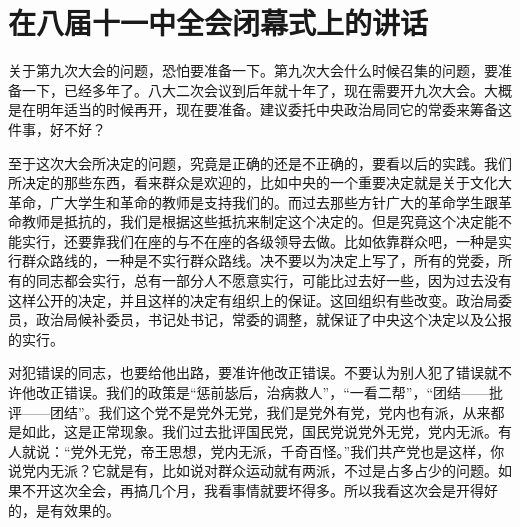 \section[在八届十一中全会闭幕式上的讲话（一九六六年八月十二日）]{在八届十一中全会闭幕式上的讲话}


关于第九次大会的问题，恐怕要准备一下。第九次大会什么时候召集的问题，要准备一下，已经多年了。八大二次会议到后年就十年了，现在需要开九次大会。大概是在明年适当的时候再开，现在要准备。建议委托中央政治局同它的常委来筹备这件事，好不好？

至于这次大会所决定的问题，究竟是正确的还是不正确的，要看以后的实践。我们所决定的那些东西，看来群众是欢迎的，比如中央的一个重要决定就是关于文化大革命，广大学生和革命的教师是支持我们的。而过去那些方针广大的革命学生跟革命教师是抵抗的，我们是根据这些抵抗来制定这个决定的。但是究竟这个决定能不能实行，还要靠我们在座的与不在座的各级领导去做。比如依靠群众吧，一种是实行群众路线的，一种是不实行群众路线。决不要以为决定上写了，所有的党委，所有的同志都会实行，总有一部分人不愿意实行，可能比过去好一些，因为过去没有这样公开的决定，并且这样的决定有组织上的保证。这回组织有些改变。政治局委员，政治局候补委员，书记处书记，常委的调整，就保证了中央这个决定以及公报的实行。

对犯错误的同志，也要给他出路，要准许他改正错误。不要认为别人犯了错误就不许他改正错误。我们的政策是“惩前毖后，治病救人”，“一看二帮”，“团结——批评——团结”。我们这个党不是党外无党，我们是党外有党，党内也有派，从来都是如此，这是正常现象。我们过去批评国民党，国民党说党外无党，党内无派。有人就说：“党外无党，帝王思想，党内无派，千奇百怪。”我们共产党也是这样，你说党内无派？它就是有，比如说对群众运动就有两派，不过是占多占少的问题。如果不开这次全会，再搞几个月，我看事情就要坏得多。所以我看这次会是开得好的，是有效果的。


